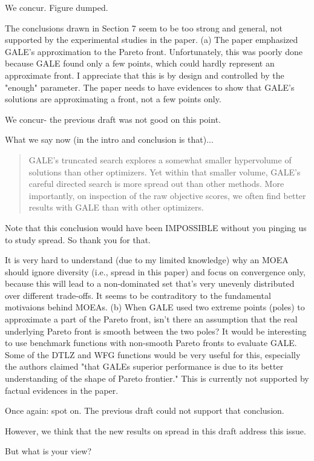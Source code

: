 \documentclass[10pt,journal,compsoc]{IEEEtran}
\newenvironment{changed}{\par\color{MyDarkBlue}}{\par}
\begin{document}
\begin{changed}
We concur. Figure dumped.
\end{changed}

The conclusions drawn in Section 7 seem to be too strong and general, not
supported by the experimental studies in the paper. (a) The paper
emphasized GALE's approximation to the Pareto front. Unfortunately, this
was poorly done because GALE found only a few points, which could hardly
represent an approximate front. I appreciate that this is by design and
controlled by the "enough" parameter. The paper needs to have evidences to
show that GALE's solutions are approximating a front, not a few points
only. 


\begin{changed}
We concur- the previous draft was not good on this point.

What we say now (in the intro and conclusion is that)...
\begin{quote}
GALE’s truncated search explores a somewhat
smaller hypervolume of solutions than other optimizers.
Yet within that smaller volume, GALE’s careful directed
search is more spread out than other methods. More
importantly, on inspection of the raw objective scores,
we often find better results with GALE than with other
optimizers.
\end{quote}
Note that this conclusion would have been IMPOSSIBLE without you
pinging us to study spread. So thank you for that.
\end{changed}

It is very hard to understand (due to my limited knowledge) why an
MOEA should ignore diversity (i.e., spread in this paper) and focus on
convergence only, because this will lead to a non-dominated set that's
very unevenly distributed over different trade-offs. It seems to be
contraditory to the fundamental motivaions behind MOEAs. (b) When GALE
used two extreme points (poles) to approximate a part of the Pareto front,
isn't there an assumption that the real underlying Pareto front is smooth
between the two poles? It would be interesting to use benchmark functions
with non-smooth Pareto fronts to evaluate GALE. Some of the DTLZ and WFG
functions would be very useful for this, especially the authors claimed
"that GALEs superior performance is due to its better understanding of the
shape of Pareto frontier." This is currently not supported by factual
evidences in the paper.
\begin{changed}
Once again: spot on. The previous draft could not support that conclusion.

However,
we think that the new results on spread in this draft address this issue.

But what is your view?
\end{changed}
\end{document}
